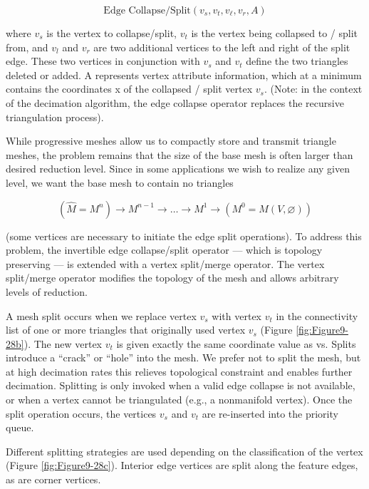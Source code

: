 \begin{description}
\begin{equation}\label{eq:9.16}
\text{Edge Collapse/Split}(v_s, v_t, v_\ell, v_r, A)
\end{equation}

where $v_s$ is the vertex to collapse/split, $v_t$ is the vertex being collapsed to / split from, and $v_l$ and $v_r$ are two additional vertices to the left and right of the split edge. These two vertices in conjunction with $v_s$ and $v_t$ define the two triangles deleted or added. A represents vertex attribute information, which at a minimum contains the coordinates x of the collapsed / split vertex $v_s$. (Note: in the context of the decimation algorithm, the edge collapse operator replaces the recursive triangulation process).

While progressive meshes allow us to compactly store and transmit triangle meshes, the problem remains that the size of the base mesh is often larger than desired reduction level. Since in some applications we wish to realize any given level, we want the base mesh to contain no triangles

\begin{equation}\label{eq:9.17}
\left(\hat{M} = M^n \right) \to M^{n - 1} \to \ldots \to M^1 \to \left(M^0 = M(V, \varnothing)\right)
\end{equation}

(some vertices are necessary to initiate the edge split operations). To address this problem, the invertible edge collapse/split operator --- which is topology preserving --- is extended with a vertex split/merge operator. The vertex split/merge operator modifies the topology of the mesh and allows arbitrary levels of reduction.

A mesh split occurs when we replace vertex $v_s$ with vertex $v_t$ in the connectivity list of one or more triangles that originally used vertex $v_s$ (Figure \ref{fig:Figure9-28b}). The new vertex $v_t$ is given exactly the same coordinate value as vs. Splits introduce a ``crack'' or ``hole'' into the mesh. We prefer not to split the mesh, but at high decimation rates this relieves topological constraint and enables further decimation. Splitting is only invoked when a valid edge collapse is not available, or when a vertex cannot be triangulated (e.g., a nonmanifold vertex). Once the split operation occurs, the vertices $v_s$ and $v_t$ are re-inserted into the priority queue.

Different splitting strategies are used depending on the classification of the vertex (Figure \ref{fig:Figure9-28c}). Interior edge vertices are split along the feature edges, as are corner vertices.


\end{description}
